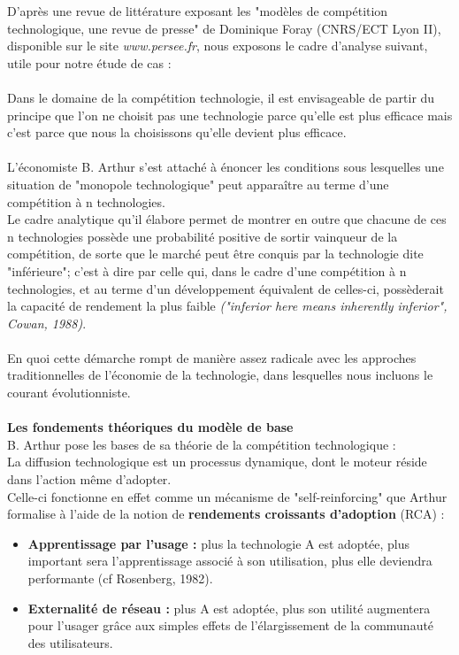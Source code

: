 \documentclass[a4paper, 10pt]{article}
\begin{document}
D'après une revue de littérature exposant les "modèles de compétition technologique, une revue de presse" de Dominique Foray (CNRS/ECT Lyon II),
disponible sur le site \textit{www.persee.fr}, nous exposons le cadre d'analyse suivant, utile pour notre étude de cas :\\ \\
Dans le domaine de la compétition technologie, il est envisageable de partir du principe que l'on ne choisit pas une technologie parce
qu'elle est plus efficace mais c'est parce que nous la choisissons qu'elle devient plus efficace.\\ \\
L'économiste B. Arthur s'est attaché à énoncer les conditions sous lesquelles une situation de "monopole technologique"
peut apparaître au terme d'une compétition à n technologies.\\
Le cadre analytique qu'il élabore permet de montrer en outre que chacune de ces n technologies possède
une probabilité positive de sortir vainqueur de la compétition, de sorte que le marché peut être conquis par la technologie dite "inférieure";
c'est à dire par celle qui, dans le cadre d'une compétition à n technologies, et au terme d'un développement équivalent de celles-ci,
possèderait la capacité de rendement la plus faible \textit{("inferior here means inherently inferior", Cowan, 1988)}.\\ \\
En quoi cette démarche rompt de manière assez radicale avec les approches traditionnelles de l'économie de la technologie,
dans lesquelles nous incluons le courant évolutionniste.\\ \\
\textbf{Les fondements théoriques du modèle de base}\\
B. Arthur pose les bases de sa théorie de la compétition technologique :\\
La diffusion technologique est un processus dynamique, dont le moteur réside dans l'action même d'adopter.\\
Celle-ci fonctionne en effet comme un mécanisme de "self-reinforcing" que Arthur formalise à l'aide de la notion
de \textbf{rendements croissants d'adoption} (RCA) :
\begin{itemize}
 \item \textbf{Apprentissage par l'usage :} plus la technologie A est adoptée, plus important sera l'apprentissage associé à son utilisation,
plus elle deviendra performante (cf Rosenberg, 1982).
 \item \textbf{Externalité de réseau :} plus A est adoptée, plus son utilité augmentera pour l'usager grâce aux simples effets de
l'élargissement de la communauté des utilisateurs.
\end{itemize}
\end{document}

